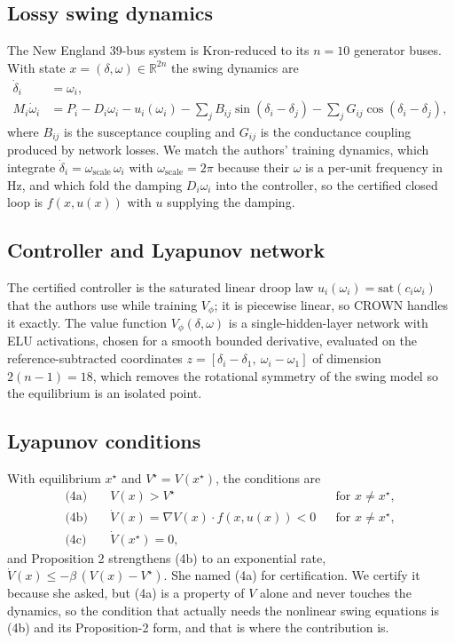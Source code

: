 \documentclass[letterpaper,journal]{IEEEtran}
\newcommand{\Lie}{\dot{V}}
\newcommand{\xstar}{x^\star}
\newcommand{\Vstar}{V^\star}
\begin{document}
\subsection{Lossy swing dynamics}
The New England 39-bus system is Kron-reduced to its $n=10$ generator buses. With
state $x=(\delta,\omega)\in\mathbb{R}^{2n}$ the swing dynamics
are~\cite{cui2022lyapunov}
\begin{align}
\dot{\delta}_i &= \omega_i, \\
M_i\dot{\omega}_i &= P_i - D_i\omega_i - u_i(\omega_i)
 - \sum_{j} B_{ij}\sin(\delta_i-\delta_j)
 - \sum_{j} G_{ij}\cos(\delta_i-\delta_j),
\end{align}
where $B_{ij}$ is the susceptance coupling and $G_{ij}$ is the conductance
coupling produced by network losses. We match the authors' training dynamics,
which integrate $\dot\delta_i = \omega_{\mathrm{scale}}\,\omega_i$ with
$\omega_{\mathrm{scale}}=2\pi$ because their $\omega$ is a per-unit frequency in
Hz, and which fold the damping $D_i\omega_i$ into the controller, so the certified
closed loop is $f(x,u(x))$ with $u$ supplying the damping.

\subsection{Controller and Lyapunov network}
The certified controller is the saturated linear droop law
$u_i(\omega_i)=\mathrm{sat}(c_i\omega_i)$ that the authors use while training
$V_\phi$; it is piecewise linear, so CROWN handles it exactly. The value function
$V_\phi(\delta,\omega)$ is a single-hidden-layer network with ELU activations,
chosen for a smooth bounded derivative, evaluated on the reference-subtracted
coordinates $z=[\delta_i-\delta_1,\ \omega_i-\omega_1]$ of dimension $2(n-1)=18$,
which removes the rotational symmetry of the swing model so the equilibrium is an
isolated point.

\subsection{Lyapunov conditions}
With equilibrium $\xstar$ and $\Vstar=V(\xstar)$, the conditions
are~\cite{cui2022lyapunov}
\begin{align}
\text{(4a)}\quad & V(x) > \Vstar && \text{for } x\neq\xstar, \\
\text{(4b)}\quad & \Lie(x) = \nabla V(x)\cdot f(x,u(x)) < 0 && \text{for } x\neq\xstar, \\
\text{(4c)}\quad & \Lie(\xstar) = 0,
\end{align}
and Proposition 2 strengthens (4b) to an exponential rate,
$\Lie(x) \le -\beta\,(V(x)-\Vstar)$. She named (4a) for certification. We certify
it because she asked, but (4a) is a property of $V$ alone and never touches the
dynamics, so the condition that actually needs the nonlinear swing equations is
(4b) and its Proposition-2 form, and that is where the contribution is.
\end{document}
